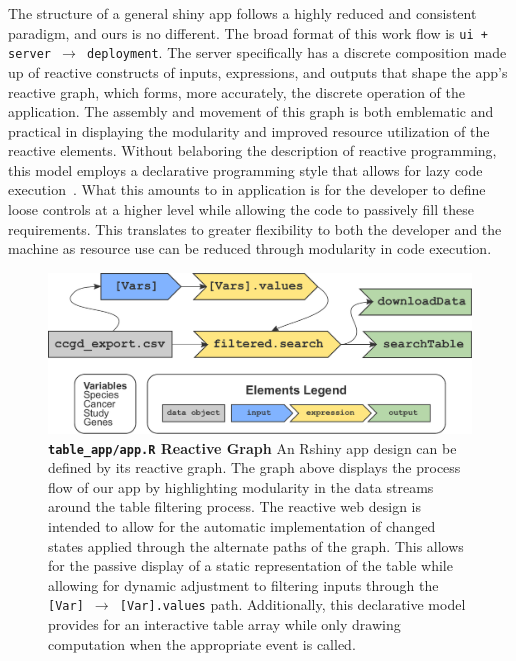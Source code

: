 \documentclass[10pt]{report}
\begin{document}
The structure of a general shiny app follows a highly reduced and consistent paradigm, and ours is no different. The broad format of this work flow is \texttt{ui + server $\rightarrow$ deployment}. The server specifically has a discrete composition made up of reactive constructs of inputs, expressions, and outputs that shape the app's reactive graph, which forms, more accurately, the discrete operation of the application. The assembly and movement of this graph is both emblematic and practical in displaying the modularity and improved resource utilization of the reactive elements. Without belaboring the description of reactive programming, this model employs a declarative programming style that allows for lazy code execution~\cite{wickhamMasteringShinyBook}. What this amounts to in application is for the developer to define loose controls at a higher level while allowing the code to passively fill these requirements. This translates to greater flexibility to both the developer and the machine as resource use can be reduced through modularity in code execution.

\begin{figure}[H]
    \centering
    \includegraphics[width=\textwidth]{fig/reactive_graph.pdf}
    \caption[\texttt{table\_app/app.R} Reactive Graph]{\textbf{\texttt{table\_app/app.R} Reactive Graph} An Rshiny app design can be defined by its reactive graph. The graph above displays the process flow of our app by highlighting modularity in the data streams around the table filtering process. The reactive web design is intended to allow for the automatic implementation of changed states applied through the alternate paths of the graph. This allows for the passive display of a static representation of the table while allowing for dynamic adjustment to filtering inputs through the \texttt{[Var] $\rightarrow$ [Var].values} path. Additionally, this declarative model provides for an interactive table array while only drawing computation when the appropriate event is called.}\label{fig:reactiveGraph}
\end{figure}
\end{document}
